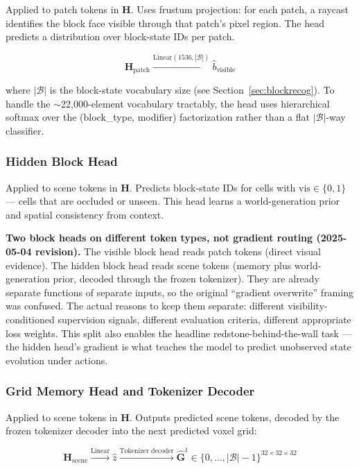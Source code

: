 \documentclass[11pt,a4paper]{article}
\begin{document}
Applied to patch tokens in $\mathbf{H}$. Uses frustum projection: for each patch, a raycast identifies the block face visible through that patch's pixel region. The head predicts a distribution over block-state IDs per patch.

\[
\mathbf{H}_\text{patch} \xrightarrow{\text{Linear}(1536, |\mathcal{B}|)} \hat{b}_\text{visible}
\]

where $|\mathcal{B}|$ is the block-state vocabulary size (see Section~\ref{sec:blockrecog}). To handle the $\sim$22{,}000-element vocabulary tractably, the head uses hierarchical softmax over the (block\_type, modifier) factorization rather than a flat $|\mathcal{B}|$-way classifier.

\subsubsection{Hidden Block Head}

Applied to scene tokens in $\mathbf{H}$. Predicts block-state IDs for cells with $\text{vis} \in \{0, 1\}$ --- cells that are occluded or unseen. This head learns a world-generation prior and spatial consistency from context.

\begin{designdecision}
\textbf{Two block heads on different token types, not gradient routing (2025-05-04 revision).} The visible block head reads patch tokens (direct visual evidence). The hidden block head reads scene tokens (memory plus world-generation prior, decoded through the frozen tokenizer). They are already separate functions of separate inputs, so the original ``gradient overwrite'' framing was confused. The actual reasons to keep them separate: different visibility-conditioned supervision signals, different evaluation criteria, different appropriate loss weights. This split also enables the headline redstone-behind-the-wall task --- the hidden head's gradient is what teaches the model to predict unobserved state evolution under actions.
\end{designdecision}

\subsubsection{Grid Memory Head and Tokenizer Decoder}

Applied to scene tokens in $\mathbf{H}$. Outputs predicted scene tokens, decoded by the frozen tokenizer decoder into the next predicted voxel grid:

\[
\mathbf{H}_\text{scene} \xrightarrow{\text{Linear}} \hat{z} \xrightarrow{\text{Tokenizer decoder}} \hat{\mathbf{G}}^t \in \{0, \ldots, |\mathcal{B}|-1\}^{32 \times 32 \times 32}
\]
\end{document}

